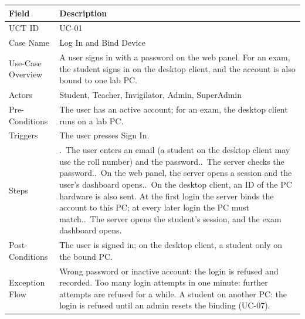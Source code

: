 \begin{lrbox}{\uctbox}{\small\renewcommand{\arraystretch}{1.1}\setlength{\tabcolsep}{6pt}%
\begin{tabular}{>{\raggedright\arraybackslash}p{3.6cm}>{\raggedright\arraybackslash}p{\dimexpr\textwidth-3.6cm-4\tabcolsep\relax}}
\hline\hline
\textbf{Field} & \textbf{Description} \\ \hline
UCT ID & UC-01 \\
Case Name & Log In and Bind Device \\
Use-Case Overview & A user signs in with a password on the web panel. For an exam, the student signs in on the desktop client, and the account is also bound to one lab PC. \\
Actors & Student, Teacher, Invigilator, Admin, SuperAdmin \\
Pre-Conditions & The user has an active account; for an exam, the desktop client runs on a lab PC. \\
Triggers & The user presses Sign In. \\
Steps & 1.~The user enters an email (a student on the desktop client may use the roll number) and the password.\newline
2.~The server checks the password.\newline
3.~On the web panel, the server opens a session and the user's dashboard opens.\newline
4.~On the desktop client, an ID of the PC hardware is also sent. At the first login the server binds the account to this PC; at every later login the PC must match.\newline
5.~The server opens the student's session, and the exam dashboard opens. \\
Post-Conditions & The user is signed in; on the desktop client, a student only on the bound PC. \\
Exception Flow & Wrong password or inactive account: the login is refused and recorded. Too many login attempts in one minute: further attempts are refused for a while. A student on another PC: the login is refused until an admin resets the binding (UC-07). \\
\hline\hline
\end{tabular}}\end{lrbox}
\begin{table}[H]
\centering
\caption{Use Case Table for Log In and Bind Device}\label{tab:uc01}
\vspace{4pt}
\usebox{\uctbox}
\end{table}

